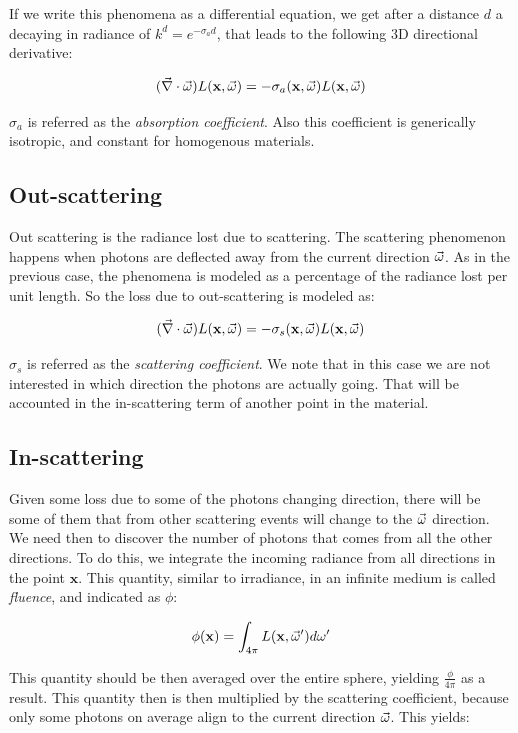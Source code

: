If we write this phenomena as a differential equation, we get after a distance $d$ a decaying in radiance of $k^d = e^{-\sigma_a d}$, that leads to the following 3D directional derivative:

$$
(\vec{\nabla} \cdot \vec{\omega}) L(\mathbf{x}, \vec{\omega}) = -\sigma_a(\mathbf{x},\vec{\omega}) L(\mathbf{x}, \vec{\omega})
$$

$\sigma_a$ is referred as the \emph{absorption coefficient}. Also this coefficient is generically isotropic, and constant for homogenous materials.

\subsection{Out-scattering}
Out scattering is the radiance lost due to scattering. The scattering phenomenon happens when photons are deflected away from the current direction $\vec{\omega}$.  As in the previous case, the phenomena is modeled as a percentage of the radiance lost per unit length. So the loss due to out-scattering is modeled as:

$$
(\vec{\nabla} \cdot \vec{\omega}) L(\mathbf{x}, \vec{\omega}) = -\sigma_s(\mathbf{x},\vec{\omega}) L(\mathbf{x}, \vec{\omega})
$$

$\sigma_s$ is referred as the \emph{scattering coefficient}. We note that in this case we are not interested in which direction the photons are actually going. That will be accounted in the in-scattering term of another point in the material.

\subsection{In-scattering}
Given some loss due to some of the photons changing direction, there will be some of them that from other scattering events will change to the $\vec{\omega}$ direction. We need then to discover the number of photons that comes from all the other directions. To do this, we integrate the incoming radiance from all directions in the point $\mathbf{x}$. This quantity, similar to irradiance, in an infinite medium is called \emph{fluence}, and indicated as $\phi$:

$$
\phi(\mathbf{x}) = \int_{4\pi} L(\mathbf{x},\vec{\omega}') d\omega'
$$

This quantity should be then averaged over the entire sphere, yielding $\frac{\phi}{4\pi}$ as a result. This quantity then is then multiplied by the scattering coefficient, because only some photons on average align to the current direction $\vec{\omega}$. This yields:

